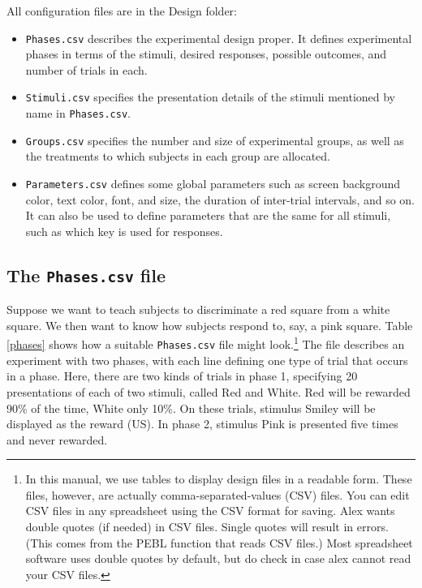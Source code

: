 \documentclass[11pt,]{article}
\begin{document}

All configuration files are in the Design folder:

\begin{itemize}
\item
  \texttt{Phases.csv} describes the experimental design proper. It
  defines experimental phases in terms of the stimuli, desired
  responses, possible outcomes, and number of trials in each.
\item
  \texttt{Stimuli.csv} specifies the presentation details of the stimuli
  mentioned by name in \texttt{Phases.csv}.
\item
  \texttt{Groups.csv} specifies the number and size of experimental
  groups, as well as the treatments to which subjects in each group are
  allocated.
\item
  \texttt{Parameters.csv} defines some global parameters such as screen
  background color, text color, font, and size, the duration of
  inter-trial intervals, and so on. It can also be used to define
  parameters that are the same for all stimuli, such as which key is
  used for responses.
\end{itemize}

\subsection{The \texttt{Phases.csv} file}\label{the-phases.csv-file}

Suppose we want to teach subjects to discriminate a red square from a
white square. We then want to know how subjects respond to, say, a pink
square. Table \ref{phases} shows how a suitable \texttt{Phases.csv} file
might look.\footnote{In this manual, we use tables to display design
  files in a readable form. These files, however, are actually
  comma-separated-values (CSV) files. You can edit CSV files in any
  spreadsheet using the CSV format for saving. Alex wants double quotes
  (if needed) in CSV files. Single quotes will result in errors. (This
  comes from the PEBL function that reads CSV files.) Most spreadsheet
  software uses double quotes by default, but do check in case alex
  cannot read your CSV files.} The file describes an experiment with two
phases, with each line defining one type of trial that occurs in a
phase. Here, there are two kinds of trials in phase 1, specifying 20
presentations of each of two stimuli, called Red and White. Red will be
rewarded 90\% of the time, White only 10\%. On these trials, stimulus
Smiley will be displayed as the reward (US). In phase 2, stimulus Pink
is presented five times and never rewarded.
\end{document}
